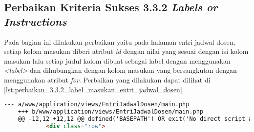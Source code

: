 \subsection{Perbaikan Kriteria Sukses 3.3.2 \textit{Labels or Instructions}}
\label{subsec:perbaikan_kriteria_sukses_3.3.2}
Pada bagian ini dilakukan perbaikan yaitu pada halaman entri jadwal dosen, setiap kolom masukan diberi atribut \textit{id} dengan nilai yang sesuai dengan isi kolom masukan lalu setiap judul kolom dibuat sebagai label dengan menggunakan \textit{<label>} dan dihubungkan dengan kolom masukan yang bersangkutan dengan menggunakan atribut \textit{for}. Perbaikan yang dilakukan dapat dilihat di \ref{lst:perbaikan_3.3.2_label_masukan_entri_jadwal_dosen}.
\begin{lstlisting}[frame=single, label={lst:perbaikan_3.3.2_label_masukan_entri_jadwal_dosen}, language=HTML, caption=Perbaikan Kriteria Sukses 3.3.2 - Tidak Terdapat Label pada Kolom Masukan di Halaman Entri Jadwal Dosen]
    --- a/www/application/views/EntriJadwalDosen/main.php
    +++ b/www/application/views/EntriJadwalDosen/main.php
    @@ -12,12 +12,12 @@ defined('BASEPATH') OR exit('No direct script access allowed');
            <div class="row">
    

\end{lstlisting}
